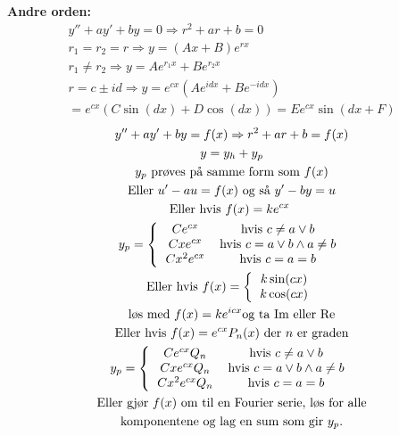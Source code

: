 \documentclass[8pt, A4paper, norsk]{extarticle}
\begin{document}
\begin{multicols*}{3}
\textbf{Andre orden:} \\
		\begin{gather*}
y'' + ay' + by = 0 \Rightarrow r^2 + ar + b = 0 \\
r_1 = r_2 = r \Rightarrow y = (Ax + B) e^{rx} \\
r_1 \neq r_2 \Rightarrow y = Ae^{r_1 x} + B e^{r_2 x} \\
r = c \pm id \Rightarrow y = e^{cx} \left( A e^{idx} + Be^{-idx} \right) \\
= e^{cx} \left( C \sin(dx) + D \cos(dx) \right) = E e^{cx} \sin(dx + F)
		\end{gather*}
		\begin{gather*}
y'' + ay' + by = f(x) \Rightarrow r^2 + ar + b = f(x) \\
y = y_h + y_p \\
y_p \text{ prøves på samme form som $f(x)$} \\
\text{Eller } u' - au = f(x) \text{ og så } y' - by = u \\
\text{Eller hvis $f(x) = ke^{cx}$ } \\
y_p = \left\{ 
\begin{tabular}{ cc }
$Ce^{cx}$ & hvis $c \neq a \vee b$ \\
$Cxe^{cx}$ & hvis $c = a \vee b \wedge a \neq b$ \\
$Cx^2e^{cx}$ & hvis $c = a = b$
\end{tabular} 
\right. \\
\text{Eller hvis } f(x) = \left\{ 
\begin{tabular}{ c }
$k \sin(cx)$ \\
$k \cos(cx)$ 
\end{tabular} 
\right. \\
\text{løs med } f(x) = ke^{icx} \text{og ta Im eller Re} \\
\text{Eller hvis } f(x) = e^{cx} P_n(x) \text{ der $n$ er graden} \\
y_p = \left\{ 
\begin{tabular}{ cc }
$Ce^{cx} Q_n$ & hvis $c \neq a \vee b$ \\
$Cxe^{cx} Q_n$ & hvis $c = a \vee b \wedge a \neq b$ \\
$Cx^2e^{cx} Q_n$ & hvis $c = a = b$
\end{tabular} 
\right. \\
\text{Eller gjør $f(x)$ om til en Fourier serie, løs for alle} \\
\text{komponentene og lag en sum som gir $y_p$.}
		\end{gather*}



\end{multicols*}
\end{document}
